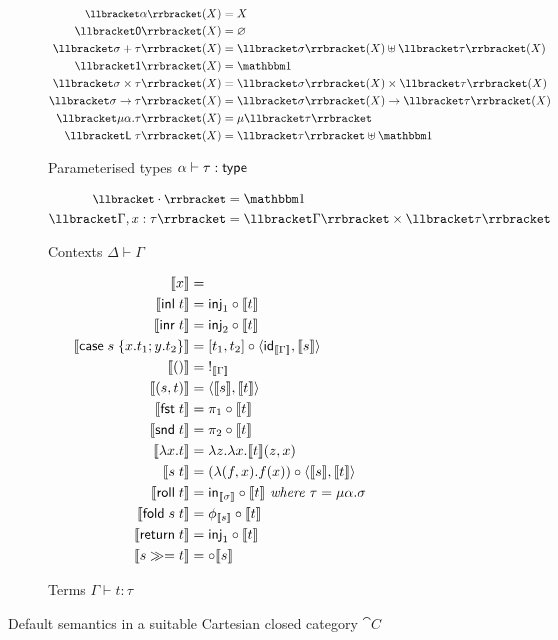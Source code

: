 \begin{figure}
\begin{subfigure}{\linewidth}
  \begin{align*}
  \small
  \sem{\alpha}(X) &= X
  \\
  \sem{\tyZero}(X) &= \varnothing
  \\
  \sem{\sigma \tySum \tau}(X) &= \sem{\sigma}(X) \uplus \sem{\tau}(X)
  \\
  \sem{\tyUnit}(X) &= \One
  \\
  \sem{\sigma \tyProd \tau}(X) &= \sem{\sigma}(X) \times \sem{\tau}(X)
  \\
  \sem{\sigma \tyFun \tau}(X) &= \sem{\sigma}(X) \to \sem{\tau}(X)
  \\
  \sem{\mu\alpha.\tau}(X) &= \mu\sem{\tau}
  \\
  \sem{\tyLift\;\tau}(X) &= \sem{\tau} \uplus \One
  \end{align*}
  \caption{Parameterised types $\alpha \vdash \tau: \mathsf{type}$}
  \label{fig:default-semantics:types}
\end{subfigure}
\begin{subfigure}{\linewidth}
  \begin{align*}
  \small
  \sem{\emptyCxt} &= \One
  \\
  \sem{\Gamma, x: \tau} &= \sem{\Gamma} \times \sem{\tau}
  \end{align*}
  \caption{Contexts $\Delta \vdash \Gamma$}
\end{subfigure}
\begin{subfigure}{\linewidth}
  \begin{align*}
  \small
  \llbracket x \rrbracket &=
  \\
  \llbracket \mathsf{inl}\;t \rrbracket &= \mathsf{inj}_1 \circ \llbracket t \rrbracket
  \\
  \llbracket \mathsf{inr}\;t \rrbracket &= \mathsf{inj}_2 \circ \llbracket t \rrbracket
  \\
  \llbracket \mathsf{case}\;s\;\{x.t_1; y.t_2\} \rrbracket &= [t_1, t_2] \circ \langle \mathsf{id}_{\llbracket \Gamma \rrbracket}, \llbracket s \rrbracket\rangle
  \\
  \llbracket () \rrbracket &=\;!_{\llbracket \Gamma \rrbracket}
  \\
  \llbracket (s,t) \rrbracket &= \langle \llbracket s \rrbracket, \llbracket t \rrbracket\rangle
  \\
  \llbracket \mathsf{fst}\;t \rrbracket &= \pi_1 \circ \llbracket t \rrbracket
  \\
  \llbracket \mathsf{snd}\;t \rrbracket &= \pi_2 \circ \llbracket t \rrbracket
  \\
  \llbracket \lambda x.t \rrbracket &= \lambda z.\lambda x.\llbracket t \rrbracket(z, x)
  \\
  \llbracket s\;t \rrbracket &= (\lambda (f, x).f(x)) \circ \langle \llbracket s \rrbracket, \llbracket t \rrbracket\rangle
  \\
  \llbracket \mathsf{roll}\;t \rrbracket &= \mathsf{in}_{\llbracket \sigma \rrbracket} \circ \llbracket t \rrbracket
  \textit{ where }\tau = \mu\alpha.\sigma
  \\
  \llbracket \mathsf{fold}\;s\;t \rrbracket &= \phi_{\llbracket s \rrbracket} \circ \llbracket t \rrbracket
  \\
  \llbracket \mathsf{return}\;t \rrbracket &= \mathsf{inj}_1 \circ \llbracket t \rrbracket
  \\
  \llbracket {s}\gg={t} \rrbracket &=
  \circ \llbracket s \rrbracket
  \end{align*}
  \caption{Terms $\Gamma \vdash t: \tau$}
\end{subfigure}
\caption{Default semantics in a suitable Cartesian closed category $\cat{C}$}
\end{figure}

